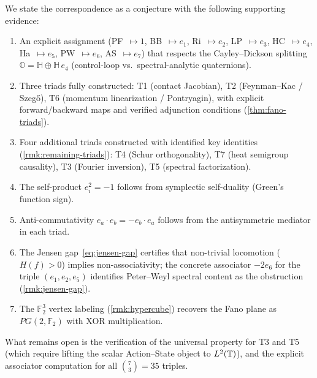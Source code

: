 \begin{remark}
\label{rmk:octonion-conjecture}
We state the correspondence as a conjecture with the following
supporting evidence:
\begin{enumerate}[label=(\alph*),nosep]
\item An explicit assignment
  (PF~$\mapsto 1$,
  BB~$\mapsto e_1$,
  Ri~$\mapsto e_2$,
  LP~$\mapsto e_3$,
  HC~$\mapsto e_4$,
  Ha~$\mapsto e_5$,
  PW~$\mapsto e_6$,
  AS~$\mapsto e_7$)
  that respects the Cayley--Dickson splitting
  $\mathbb{O} = \mathbb{H} \oplus \mathbb{H}\,e_4$
  (control-loop vs.\ spectral-analytic quaternions).
\item Three triads fully constructed:
  T1 (contact Jacobian),
  T2 (Feynman--Kac / Szeg\H{o}),
  T6 (momentum linearization / Pontryagin),
  with explicit forward/backward maps and verified adjunction
  conditions (\cref{thm:fano-triads}).
\item Four additional triads constructed with identified key
  identities (\cref{rmk:remaining-triads}):
  T4 (Schur orthogonality),
  T7 (heat semigroup causality),
  T3 (Fourier inversion),
  T5 (spectral factorization).
\item The self-product $e_i^2 = -1$ follows from
  symplectic self-duality (Green's function sign).
\item Anti-commutativity $e_a \cdot e_b = -e_b \cdot e_a$
  follows from the antisymmetric mediator in each triad.
\item The Jensen gap~\eqref{eq:jensen-gap} certifies that
  non-trivial locomotion ($H(f) > 0$) implies
  non-associativity; the concrete associator
  $-2e_6$ for the triple $(e_1, e_2, e_5)$
  identifies Peter--Weyl spectral content as the obstruction
  (\cref{rmk:jensen-gap}).
\item The $\mathbb{F}_2^3$ vertex labeling
  (\cref{rmk:hypercube}) recovers the Fano plane as
  $PG(2, \mathbb{F}_2)$ with XOR multiplication.
\end{enumerate}
What remains open is the verification of the universal property
for T3 and T5 (which require lifting the scalar Action--State
object to $L^2(\mathbb{T})$), and the explicit associator computation
for all $\binom{7}{3} = 35$ triples.
\end{remark}
